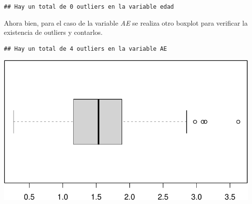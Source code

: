 \documentclass[
]{article}
\newenvironment{Shaded}{\begin{snugshade}}{\end{snugshade}}
\newcommand{\AttributeTok}[1]{\textcolor[rgb]{0.77,0.63,0.00}{#1}}
\newcommand{\ConstantTok}[1]{\textcolor[rgb]{0.00,0.00,0.00}{#1}}
\newcommand{\FunctionTok}[1]{\textcolor[rgb]{0.00,0.00,0.00}{#1}}
\newcommand{\NormalTok}[1]{#1}
\newcommand{\OtherTok}[1]{\textcolor[rgb]{0.56,0.35,0.01}{#1}}
\newcommand{\SpecialCharTok}[1]{\textcolor[rgb]{0.00,0.00,0.00}{#1}}
\newcommand{\StringTok}[1]{\textcolor[rgb]{0.31,0.60,0.02}{#1}}
\begin{document}
\begin{verbatim}
## Hay un total de 0 outliers en la variable edad
\end{verbatim}

\vspace{0.3cm}

Ahora bien, para el caso de la variable \emph{AE} se realiza otro
boxplot para verificar la existencia de outliers y contarlos.

\vspace{0.3cm}

\begin{Shaded}
\end{Shaded}

\begin{verbatim}
## Hay un total de 4 outliers en la variable AE
\end{verbatim}

\begin{Shaded}
\end{Shaded}

\includegraphics{A4_files/figure-latex/unnamed-chunk-15-1.pdf}

\vspace{0.3cm}
\end{document}

